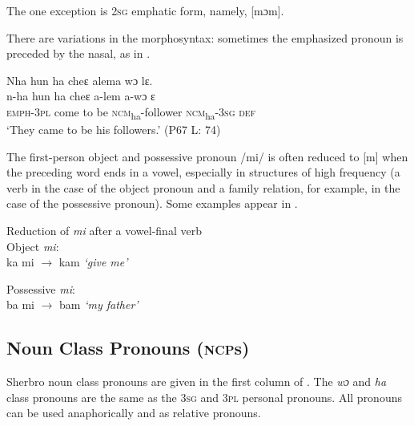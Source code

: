 \z
\z

The one exception is \textsc{2sg} emphatic form, namely, [mɔm].

There are variations in the morphosyntax: sometimes the emphasized pronoun is preceded by the nasal, as in .

\newpage
\ea%
    \label{ex:55}
    Nha hun ha cheɛ alema wɔ lɛ.\\
    \gll n-ha      hun    ha    cheɛ  a-lem          a-wɔ        ɛ\\
    \textsc{emph-3pl}  come    to    be    \textsc{ncm}\textsubscript{ha}{}-follower  \textsc{ncm}\textsubscript{ha}{}-\textsc{3sg}    \textsc{def}\\
    \glt ‘They came to be his followers.' (P67 L: 74)
\z


The first-person object and possessive pronoun /mi/ is often reduced to [m] when the preceding word ends in a vowel, especially in structures of high frequency (a verb in the case of the object pronoun and a family relation, for example, in the case of the possessive pronoun). Some examples appear in .

\ea%
    \label{ex:56}
    Reduction of \textit{mi} after a vowel-final verb\\
\ea Object \textit{mi}:\\     ka mi $\xrightarrow{}$ kam \textit{‘give me'}

\ex Possessive \textit{mi}:\\
ba mi $\xrightarrow{}$ bam \textit{‘my father'}
\z
\z

\subsection{Noun Class Pronouns (\textsc{ncp}s)}
\label{sec:3.3.2}\hypertarget{Toc115517764}{}
Sherbro noun class pronouns are given in the first column of . The \textit{wɔ} and \textit{ha} class pronouns are the same as the \textsc{3sg} and \textsc{3pl} personal pronouns. All pronouns can be used anaphorically and as relative pronouns.

